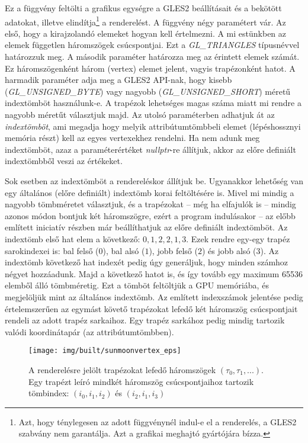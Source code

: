 \documentclass[12pt]{report}
\theoremstyle{definition}
\newcommand{\func}[1]{{\textsl{#1}}}
\begin{document}
Ez a függvény feltölti a grafikus egységre a GLES2 beállításait és a bekötött
adatokat, illetve elindítja\footnote{Azt, hogy ténylegesen az adott függvénynél
indul-e el a renderelés, a GLES2 szabvány nem garantálja. Azt a grafikai
meghajtó gyártójára bízza.} a renderelést. A függvény négy paramétert vár. Az
első, hogy a kirajzolandó elemeket hogyan kell értelmezni. A mi estünkben az
elemek független háromszögek csúcspontjai. Ezt a \func{GL\_TRIANGLES}
típusnévvel határozzuk meg. A második paraméter határozza meg az érintett
elemek számát. Ez háromszögenként három (vertex) elemet jelent, vagyis
trapézonként hatot. A harmadik paraméter adja meg a GLES2 API-nak, hogy kisebb
(\func{GL\_UNSIGNED\_BYTE}) vagy nagyobb (\func{GL\_UNSIGNED\_SHORT}) méretű
indextömböt használunk-e. A trapézok lehetséges magas száma miatt mi rendre a
nagyobb méretűt választjuk majd. Az utolsó paraméterben adhatjuk át az
\emph{indextömböt}, ami megadja hogy melyik attribútumtömbbeli elemet (lépéshossznyi
memória részt) kell az egyes vertexekhez rendelni. Ha nem adunk meg
indextömböt, azaz a paraméterértéket \func{nullptr}-re állítjuk, akkor
az előre definiált indextömbből veszi az értékeket.

Sok esetben az indextömböt a rendereléskor állítjuk be. Ugyanakkor lehetőség
van egy általános (előre definiált) indextömb korai feltöltésére is. Mivel mi
mindig a nagyobb tömbméretet választjuk, és a trapézokat -- még ha elfajulók is
-- mindig azonos módon bontjuk két háromszögre, ezért a program indulásakor --
az előbb említett iniciatív részben már beállíthatjuk az előre definiált
indextömböt. Az indextömb első hat elem a következő: $0, 1, 2, 2, 1, 3$. Ezek
rendre egy-egy trapéz sarokindexei is: bal felső ($0$), bal alsó ($1$), jobb
felső ($2$) és jobb alsó ($3$). Az indextömb következő hat indexét pedig úgy
generáljuk, hogy minden számhoz négyet hozzáadunk. Majd a következő hatot is,
és így tovább egy maximum 65536 elemből álló tömbméretig. Ezt a tömböt
feltöltjük a GPU memóriába, és megjelöljük mint az általános indextömb. Az
említett indexszámok jelentése pedig értelemszerűen az egymást követő
trapézokat lefedő két háromszög csúcspontjait rendeli az adott trapéz
sarkaihoz. Egy trapéz sarkához pedig mindig tartozik valódi koordinátapár (az
attribútumtömbben).

  \begin{figure}
    \centering
    \texttt{[image: img/built/sunmoonvertex\_eps]}
    \caption{\label{fig:sunmoonvertex}A renderelésre jelölt trapézokat lefedő
    háromszögek $(\tau_0, \tau_1, ...)$. Egy trapézt leíró mindkét háromszög
    csúcspontjaihoz tartozik tömbindex: $(i_0, i_1, i_2)$ és $(i_2, i_1, i_3)$}
  \end{figure}
\end{document}
